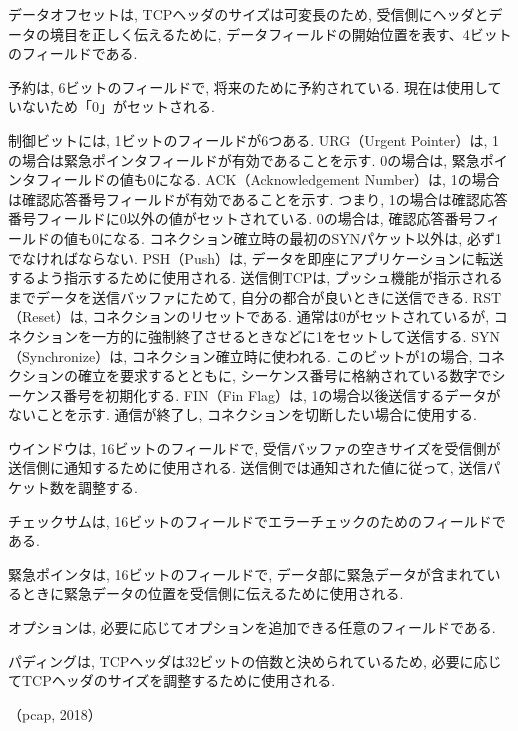 \documentclass{ltjsarticle} %
\begin{document}
データオフセットは, TCPヘッダのサイズは可変長のため, 受信側にヘッダとデータの境目を正しく伝えるために, 
データフィールドの開始位置を表す、4ビットのフィールドである. 

予約は, 6ビットのフィールドで, 将来のために予約されている. 現在は使用していないため「0」がセットされる. 

制御ビットには, 1ビットのフィールドが6つある. 
URG（Urgent Pointer）は, 1の場合は緊急ポインタフィールドが有効であることを示す. 0の場合は, 緊急ポインタフィールドの値も0になる. 
ACK（Acknowledgement Number）は, 1の場合は確認応答番号フィールドが有効であることを示す. 
つまり, 1の場合は確認応答番号フィールドに0以外の値がセットされている. 
0の場合は, 確認応答番号フィールドの値も0になる. コネクション確立時の最初のSYNパケット以外は, 必ず1でなければならない. 
PSH（Push）は, データを即座にアプリケーションに転送するよう指示するために使用される. 
送信側TCPは, プッシュ機能が指示されるまでデータを送信バッファにためて, 自分の都合が良いときに送信できる. 
RST（Reset）は, コネクションのリセットである. 通常は0がセットされているが, コネクションを一方的に強制終了させるときなどに1をセットして送信する. 
SYN（Synchronize）は, コネクション確立時に使われる. このビットが1の場合, コネクションの確立を要求するとともに, 
シーケンス番号に格納されている数字でシーケンス番号を初期化する. 
FIN（Fin Flag）は, 1の場合以後送信するデータがないことを示す. 通信が終了し, コネクションを切断したい場合に使用する. 

ウインドウは, 16ビットのフィールドで, 受信バッファの空きサイズを受信側が送信側に通知するために使用される. 
送信側では通知された値に従って, 送信パケット数を調整する. 

チェックサムは, 16ビットのフィールドでエラーチェックのためのフィールドである. 

緊急ポインタは, 16ビットのフィールドで, データ部に緊急データが含まれているときに緊急データの位置を受信側に伝えるために使用される. 

オプションは, 必要に応じてオプションを追加できる任意のフィールドである. 

パディングは, TCPヘッダは32ビットの倍数と決められているため, 必要に応じてTCPヘッダのサイズを調整するために使用される. 

（pcap, 2018）
\end{document}
